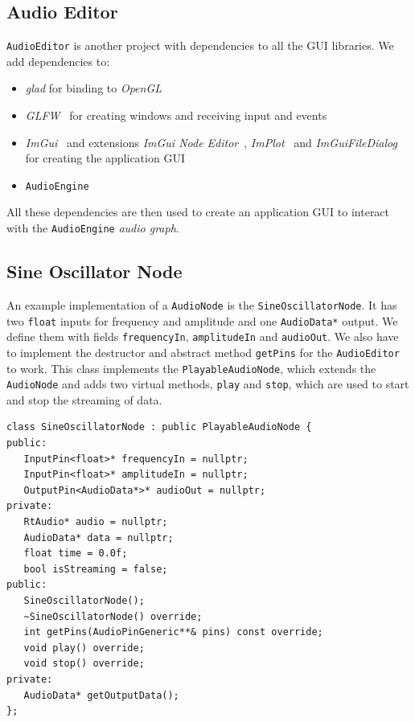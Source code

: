 \documentclass[conference]{IEEEtran}
\begin{document}
\subsection{Audio Editor}
\texttt{AudioEditor} is another project with dependencies to all the GUI libraries. We add dependencies to:\begin{itemize}
    \item \textit{glad} for binding to \textit{OpenGL}~\cite{opengl}
    \item \textit{GLFW}~\cite{glfw} for creating windows and receiving input and events
    \item \textit{ImGui}~\cite{imgui} and extensions \textit{ImGui Node Editor}~\cite{imguinodeeditor}, \textit{ImPlot}~\cite{implot} and \textit{ImGuiFileDialog}~\cite{imguifiledialog} for creating the application GUI
    \item \texttt{AudioEngine}
\end{itemize}

All these dependencies are then used to create an application GUI to interact with the \texttt{AudioEngine} \textit{audio graph}.

\subsection{Sine Oscillator Node}
An example implementation of a \texttt{AudioNode} is the \texttt{SineOscillatorNode}. It has two \texttt{float} inputs for frequency and amplitude and one \texttt{AudioData*} output. We define them with fields \texttt{frequencyIn}, \texttt{amplitudeIn} and \texttt{audioOut}. We also have to implement the destructor and abstract method \texttt{getPins} for the \texttt{AudioEditor} to work. This class implements the \texttt{PlayableAudioNode}, which extends the \texttt{AudioNode} and adds two virtual methods, \texttt{play} and \texttt{stop}, which are used to start and stop the streaming of data.

\begin{lstlisting}
class SineOscillatorNode : public PlayableAudioNode {
public:
   InputPin<float>* frequencyIn = nullptr;
   InputPin<float>* amplitudeIn = nullptr;
   OutputPin<AudioData*>* audioOut = nullptr;
private:
   RtAudio* audio = nullptr;
   AudioData* data = nullptr;
   float time = 0.0f;
   bool isStreaming = false;
public:
   SineOscillatorNode();
   ~SineOscillatorNode() override;
   int getPins(AudioPinGeneric**& pins) const override;
   void play() override;
   void stop() override;
private:
   AudioData* getOutputData();
};
\end{lstlisting}
\end{document}
